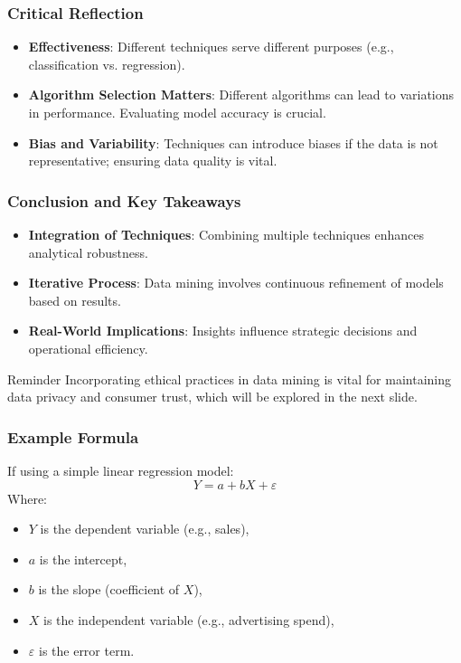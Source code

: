 \documentclass[aspectratio=169]{beamer}
\begin{document}
\begin{frame}[fragile]
    \frametitle{Critical Reflection}
    \begin{itemize}
        \item \textbf{Effectiveness}: Different techniques serve different purposes (e.g., classification vs. regression).
        \item \textbf{Algorithm Selection Matters}: Different algorithms can lead to variations in performance. Evaluating model accuracy is crucial.
        \item \textbf{Bias and Variability}: Techniques can introduce biases if the data is not representative; ensuring data quality is vital.
    \end{itemize}
\end{frame}

\begin{frame}[fragile]
    \frametitle{Conclusion and Key Takeaways}
    \begin{itemize}
        \item \textbf{Integration of Techniques}: Combining multiple techniques enhances analytical robustness.
        \item \textbf{Iterative Process}: Data mining involves continuous refinement of models based on results.
        \item \textbf{Real-World Implications}: Insights influence strategic decisions and operational efficiency.
    \end{itemize}
    \begin{block}{Reminder}
        Incorporating ethical practices in data mining is vital for maintaining data privacy and consumer trust, which will be explored in the next slide.
    \end{block}
\end{frame}

\begin{frame}[fragile]
    \frametitle{Example Formula}
    If using a simple linear regression model:
    \begin{equation}
        Y = a + bX + \varepsilon
    \end{equation}
    Where:
    \begin{itemize}
        \item $Y$ is the dependent variable (e.g., sales),
        \item $a$ is the intercept,
        \item $b$ is the slope (coefficient of $X$),
        \item $X$ is the independent variable (e.g., advertising spend),
        \item $\varepsilon$ is the error term.
    \end{itemize}
\end{frame}
\end{document}
